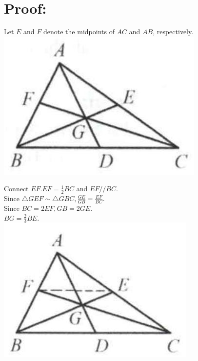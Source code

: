 \documentclass[10pt]{article}
\begin{document}
\section*{Proof:}
Let \(E\) and \(F\) denote the midpoints of \(A C\) and \(A B\), respectively.\\
\includegraphics[max width=\textwidth, center]{2025_04_17_97bc1f7e44d93c271a88g-007(2)}

Connect \(E F . E F=\frac{1}{2} B C\) and \(E F / / B C\).\\
Since \(\triangle G E F \sim \triangle G B C, \frac{G E}{G B}=\frac{E F}{B C}\).\\
Since \(B C=2 E F, G B=2 G E\).\\
\(B G=\frac{2}{3} B E\).\\
\includegraphics[max width=\textwidth, center]{2025_04_17_97bc1f7e44d93c271a88g-007}
\end{document}
